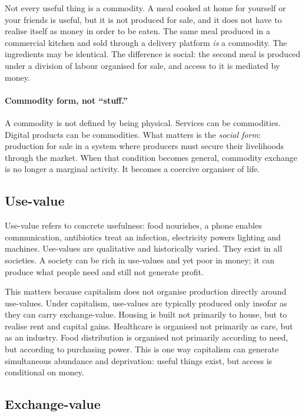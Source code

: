 Not every useful thing is a commodity. A meal cooked at home for yourself or your friends is useful, but it
is not produced for sale, and it does not have to realise itself as money in order to be eaten. The same
meal produced in a commercial kitchen and sold through a delivery platform \emph{is} a commodity. The
ingredients may be identical. The difference is social: the second meal is produced under a division of
labour organised for sale, and access to it is mediated by money.

\paragraph{Commodity form, not ``stuff.''}
A commodity is not defined by being physical. Services can be commodities. Digital products can be commodities.
What matters is the \emph{social form}: production for sale in a system where producers must secure their
livelihoods through the market. When that condition becomes general, commodity exchange is no longer a marginal
activity. It becomes a coercive organiser of life.

\subsection{Use-value}
\label{sec:use-value}

Use-value refers to concrete usefulness: food nourishes, a phone enables communication, antibiotics treat an
infection, electricity powers lighting and machines. Use-values are qualitative and historically varied. They
exist in all societies. A society can be rich in use-values and yet poor in money; it can produce what people
need and still not generate profit.

This matters because capitalism does not organise production directly around use-values. Under capitalism,
use-values are typically produced only insofar as they can carry exchange-value. Housing is built not primarily
to house, but to realise rent and capital gains. Healthcare is organised not primarily as care, but as an
industry. Food distribution is organised not primarily according to need, but according to purchasing power.
This is one way capitalism can generate simultaneous abundance and deprivation: useful things exist, but access
is conditional on money.

\subsection{Exchange-value}
\label{sec:exchange-value}

